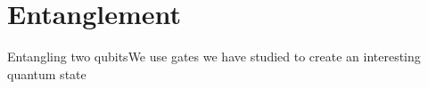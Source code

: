 \section{Entanglement}

\begin{frame}{Entangling two qubits}{We use gates we have studied to create an interesting quantum state}

\end{frame}

